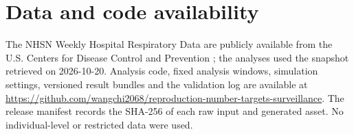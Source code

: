 \section*{Data and code availability}
\label{sec:availability}

The NHSN Weekly Hospital Respiratory Data are publicly available from the U.S. Centers for Disease Control and Prevention \citep{cdc2026nhsn}; the analyses used the snapshot retrieved on 2026-10-20. Analysis code, fixed analysis windows, simulation settings, versioned result bundles and the validation log are available at \url{https://github.com/wangchi2068/reproduction-number-targets-surveillance}. The release manifest records the SHA-256 of each raw input and generated asset. No individual-level or restricted data were used.
